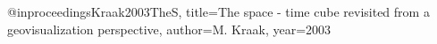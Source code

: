 @inproceedings{Kraak2003TheS,
  title={The space - time cube revisited from a geovisualization perspective},
  author={M. Kraak},
  year={2003}
}